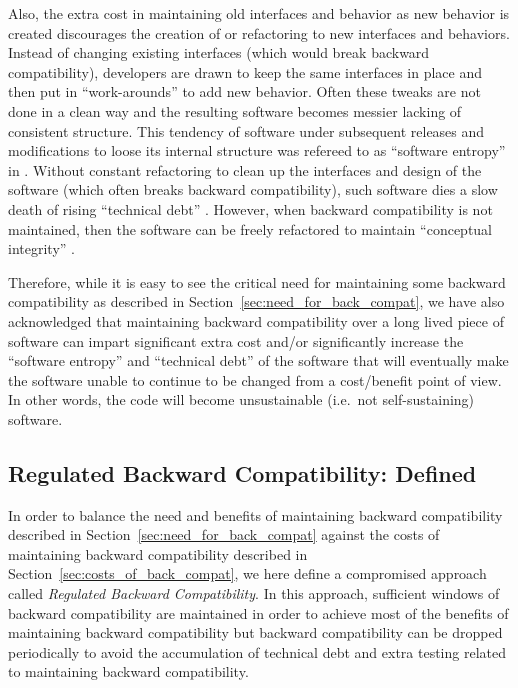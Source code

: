 \documentclass[11pt]{SANDreport}
\begin{document}
Also, the extra cost in maintaining old interfaces and behavior as new
behavior is created discourages the creation of or refactoring to new
interfaces and behaviors.  Instead of changing existing interfaces
(which would break backward compatibility), developers are drawn to
keep the same interfaces in place and then put in ``work-arounds'' to
add new behavior.  Often these tweaks are not done in a clean way and
the resulting software becomes messier lacking of consistent
structure.  This tendency of software under subsequent releases and
modifications to loose its internal structure was refereed to as
``software entropy'' in {}\cite{MythicalManMonth95}.  Without constant
refactoring to clean up the interfaces and design of the software
(which often breaks backward compatibility), such software dies a slow
death of rising ``technical debt''
{}\cite{ImplementingLeanSoftwareDevelopment}.  However, when backward
compatibility is not maintained, then the software can be freely
refactored to maintain ``conceptual integrity''
{}\cite{MythicalManMonth95}.

Therefore, while it is easy to see the critical need for maintaining
some backward compatibility as described in
Section~\ref{sec:need_for_back_compat}, we have also acknowledged that
maintaining backward compatibility over a long lived piece of software
can impart significant extra cost and/or significantly increase the
``software entropy'' and ``technical debt'' of the software that will
eventually make the software unable to continue to be changed from a
cost/benefit point of view.  In other words, the code will become
unsustainable (i.e.\ not self-sustaining) software.

%
{}\subsection{Regulated Backward Compatibility: Defined}
\label{sec:defined_reg_back_compat}
%

In order to balance the need and benefits of maintaining backward
compatibility described in Section~\ref{sec:need_for_back_compat}
against the costs of maintaining backward compatibility described in
Section~\ref{sec:costs_of_back_compat}, we here define a compromised
approach called {}\textit{Regulated Backward Compatibility}.  In this
approach, sufficient windows of backward compatibility are maintained
in order to achieve most of the benefits of maintaining backward
compatibility but backward compatibility can be dropped periodically
to avoid the accumulation of technical debt and extra testing related
to maintaining backward compatibility.
\end{document}
